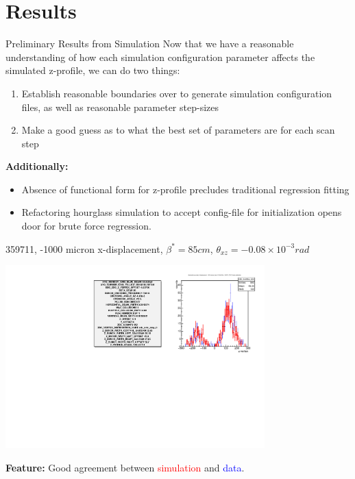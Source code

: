\section{Results}
\label{ch:HourglassResults}

\begin{frame}{Preliminary Results from Simulation}
Now that we have a reasonable understanding of how each simulation configuration parameter affects the simulated z-profile, we can do two things:
\begin{enumerate}
\item Establish reasonable boundaries over to generate simulation configuration files, as well as reasonable parameter step-sizes
\item Make a good guess as to what the best set of parameters are for each scan step
\end{enumerate}

\textbf{Additionally:}
\begin{itemize}
\item Absence of functional form for z-profile precludes traditional regression fitting
\item Refactoring hourglass simulation to accept config-file for initialization opens door for brute force regression.
\end{itemize}
\end{frame}

\begin{frame}{359711, -1000 micron x-displacement, $\beta^{*} = 85 cm$, $\theta_{xz} = -0.08\times10^{-3}rad$}
\begin{center}
\includegraphics[width=10cm,scale=0.8]{../HourglassResults/figs/359711_step0_config_compare.pdf}
\end{center}
\textbf{Feature:} Good agreement between \textcolor{red}{simulation} and \textcolor{blue}{data}.
\end{frame}

